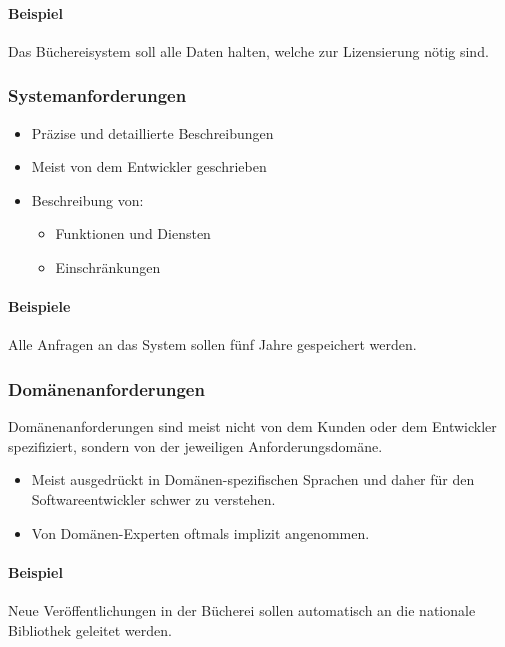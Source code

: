 				\paragraph{Beispiel}
					Das Büchereisystem soll alle Daten halten, welche zur Lizensierung nötig sind.

			\subsubsection{Systemanforderungen}
				\begin{itemize}
					\item Präzise und detaillierte Beschreibungen
					\item Meist von dem Entwickler geschrieben
					\item Beschreibung von:
						\begin{itemize}
							\item Funktionen und Diensten
							\item Einschränkungen
						\end{itemize}
				\end{itemize}

				\paragraph{Beispiele}
					Alle Anfragen an das System sollen fünf Jahre gespeichert werden.

			\subsubsection{Domänenanforderungen}
				Domänenanforderungen sind meist nicht von dem Kunden oder dem Entwickler spezifiziert, sondern von der jeweiligen Anforderungsdomäne.

				\begin{itemize}
					\item Meist ausgedrückt in Domänen-spezifischen Sprachen und daher für den Softwareentwickler schwer zu verstehen.
					\item Von Domänen-Experten oftmals implizit angenommen.
				\end{itemize}

				\paragraph{Beispiel}
					Neue Veröffentlichungen in der Bücherei sollen automatisch an die nationale Bibliothek geleitet werden.

